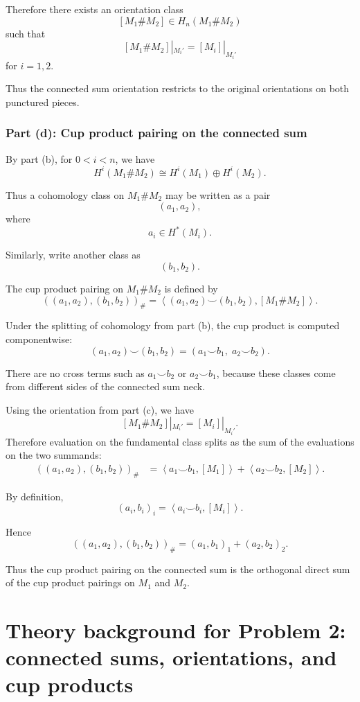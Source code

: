 \documentclass[12pt,a4paper]{article}
\theoremstyle{notespace}
\begin{document}
Therefore there exists an orientation class
\[
[M_1\#M_2]\in H_n(M_1\#M_2)
\]
such that
\[
\boxed{
	[M_1\#M_2]|_{M_i'}
	=
	[M_i]|_{M_i'}
}
\]
for \(i=1,2\).

Thus the connected sum orientation restricts to the original orientations on
both punctured pieces.

\subsubsection*{Part (d): Cup product pairing on the connected sum}

By part (b), for \(0<i<n\), we have
\[
H^i(M_1\#M_2)
\cong
H^i(M_1)\oplus H^i(M_2).
\]

Thus a cohomology class on \(M_1\#M_2\) may be written as a pair
\[
(a_1,a_2),
\]
where
\[
a_i\in H^*(M_i).
\]

Similarly, write another class as
\[
(b_1,b_2).
\]

The cup product pairing on \(M_1\#M_2\) is defined by
\[
((a_1,a_2),(b_1,b_2))_{\#}
=
\left\langle
(a_1,a_2)\smile (b_1,b_2),
[M_1\#M_2]
\right\rangle.
\]

Under the splitting of cohomology from part (b), the cup product is computed
componentwise:
\[
(a_1,a_2)\smile (b_1,b_2)
=
(a_1\smile b_1,\; a_2\smile b_2).
\]

There are no cross terms such as \(a_1\smile b_2\) or \(a_2\smile b_1\),
because these classes come from different sides of the connected sum neck.

Using the orientation from part (c), we have
\[
[M_1\#M_2]|_{M_i'}
=
[M_i]|_{M_i'}.
\]
Therefore evaluation on the fundamental class splits as the sum of the
evaluations on the two summands:
\[
\begin{aligned}
	((a_1,a_2),(b_1,b_2))_{\#}
	&=
	\left\langle
	a_1\smile b_1,[M_1]
	\right\rangle
	+
	\left\langle
	a_2\smile b_2,[M_2]
	\right\rangle.
\end{aligned}
\]

By definition,
\[
(a_i,b_i)_i
=
\left\langle
a_i\smile b_i,[M_i]
\right\rangle.
\]

Hence
\[
\boxed{
	((a_1,a_2),(b_1,b_2))_{\#}
	=
	(a_1,b_1)_1+(a_2,b_2)_2.
}
\]

Thus the cup product pairing on the connected sum is the orthogonal direct
sum of the cup product pairings on \(M_1\) and \(M_2\).

	
\section{Theory background for Problem 2: connected sums, orientations, and cup products}
\end{document}
